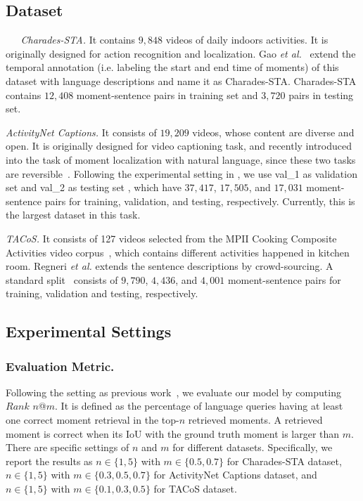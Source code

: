 \documentclass[letterpaper]{article} %
\begin{document}
\subsection{Dataset}

\textit{~~~Charades-STA.} 
It contains $9,848$ videos of daily indoors activities. It is originally designed for action recognition and localization. Gao \textit{et al.}~\cite{gao2017tall} extend the temporal annotation (i.e. labeling the start and end time of moments) of this dataset with language descriptions and name it as Charades-STA. Charades-STA contains $12,408$ moment-sentence pairs in training set and $3,720$ pairs in testing set.


\textit{ActivityNet Captions.} It consists of $19,209$  videos, whose content are diverse and open.
It is originally designed for video captioning task, and recently introduced into the task of moment localization with natural language, since these two tasks are reversible~\cite{chen2018temporally,zhang2019cross}.
Following the experimental setting in \cite{zhang2019cross}, we use val\_1 as validation set and val\_2 as testing set , which have $37,417$, $17,505$, and $17,031$ moment-sentence pairs for training, validation, and testing, respectively. Currently, this is the largest dataset in this task.

\textit{TACoS.}
It consists of 127 videos selected from the MPII Cooking Composite Activities video corpus~\cite{rohrbach2012script}, which contains different activities happened in kitchen room.
Regneri \textit{et al.} extends the sentence descriptions by crowd-sourcing.
A standard split~\cite{gao2017tall} consists of $9,790$, $4,436$, and $4,001$ moment-sentence pairs for training, validation and testing, respectively.

\subsection{Experimental Settings}

\subsubsection{Evaluation Metric.}
Following the setting as previous work~\cite{gao2017tall}, we evaluate our model by computing $Rank$ $n$@$m$. It is defined as the percentage of language queries having at least one correct moment retrieval in the top-$n$ retrieved moments. A retrieved moment is correct when its IoU with the ground truth moment is larger than $m$. 
There are specific settings of $n$ and $m$ for different datasets. Specifically,
we report the results as $n\in\{1, 5\}$ with $m\in\{0.5,0.7\}$ for Charades-STA dataset, $n\in\{1, 5\}$ with $m\in\{0.3,0.5,0.7\}$ for ActivityNet Captions dataset, and $n\in\{1, 5\}$ with $m\in\{0.1,0.3,0.5\}$ for TACoS dataset.
\end{document}
